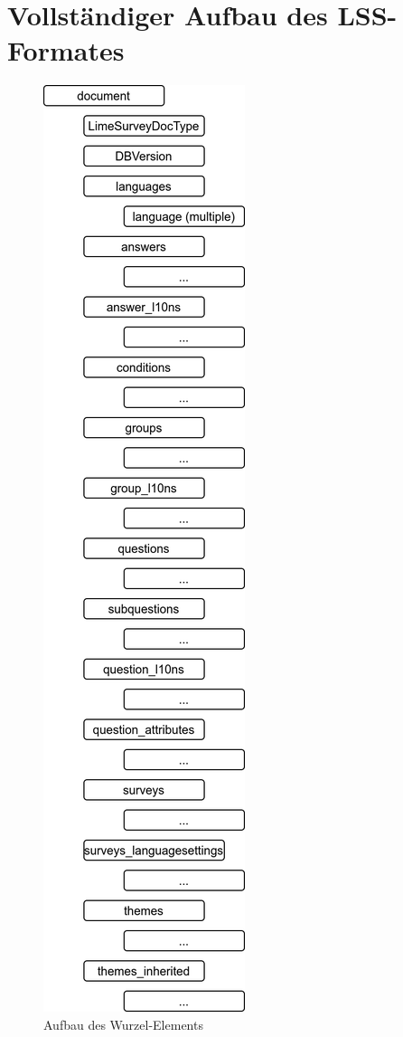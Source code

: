 \appendix

\chapter{Vollständiger Aufbau des LSS-Formates}
\label{app:lss}

\begin{figure}[h]
			\centering
			\includegraphics[width=.25\textwidth]{./img/append_lss.png}
			\caption{Aufbau des Wurzel-Elements }
			\label{app:lss_struct}
\end{figure}

